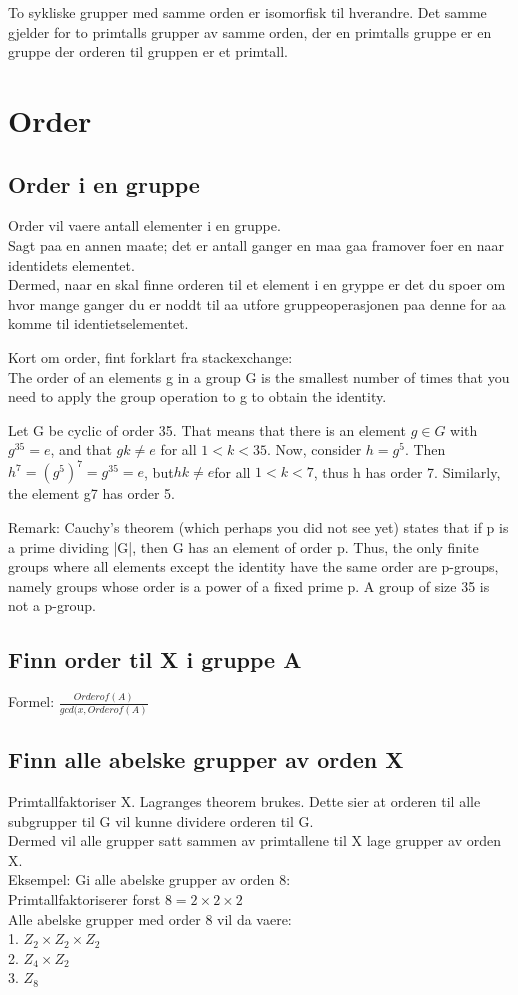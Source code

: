\documentclass[12pt,a4paper]{article}
\begin{document}
To sykliske grupper med samme orden er isomorfisk til hverandre. 
Det samme gjelder for to primtalls grupper av samme orden, der en primtalls gruppe er en gruppe der orderen til gruppen er et primtall. 

\section*{Order}
\subsection*{Order i en gruppe}
Order vil vaere antall elementer i en gruppe.\\
Sagt paa en annen maate; det er antall ganger en maa gaa framover foer en naar identidets elementet. \\
Dermed, naar en skal finne orderen til et element i en gryppe er det du spoer om hvor mange ganger du er noddt til aa utfore gruppeoperasjonen paa denne for aa komme til identietselementet.

Kort om order, fint forklart fra stackexchange:\\
The order of an elements g in a group G is the smallest number of times that you need to apply the group operation to g to obtain the identity.

Let G be cyclic of order 35. That means that there is an element $g \in G$ with $g^{35}=e$, and that $gk\neq e$ for all $1<k<35$. Now, consider $h=g^5.$ Then $h^7=(g^5)^7=g^{35}=e$, but$ hk \neq e $for all $1<k<7$, thus h has order 7. Similarly, the element g7 has order 5.

Remark: Cauchy's theorem (which perhaps you did not see yet) states that if p is a prime dividing |G|, then G has an element of order p. Thus, the only finite groups where all elements except the identity have the same order are p-groups, namely groups whose order is a power of a fixed prime p. A group of size 35 is not a p-group.

\subsection*{Finn order til X i gruppe A}
Formel: $\frac{Order of(A)}{gcd(x, Order of (A)}$

\subsection*{Finn alle abelske grupper av orden X}
Primtallfaktoriser X. Lagranges theorem brukes. Dette sier at orderen til alle subgrupper til G vil kunne dividere orderen til G. \\
Dermed vil alle grupper satt sammen av primtallene til X lage grupper av orden X.\\
Eksempel: Gi alle abelske grupper av orden 8:\\
Primtallfaktoriserer forst $8 = 2 \times 2 \times 2$\\
Alle abelske grupper med order 8 vil da vaere:\\
1. $Z_2 \times Z_2 \times Z_2$\\
2. $Z_4 \times Z_2$\\
3. $Z_8$
\end{document}
